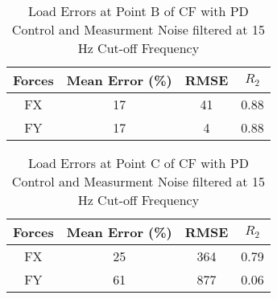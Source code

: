 \begin{table}[h!]
	\centering
	\begin{tabular}{ |c|c|c|c| } 
		\hline
		Forces & Mean Error (\%) & RMSE & $R_2$\\ 
		\hline
		FX & 17&41&0.88\\ 
		FY & 17&4&0.88 \\ 
		\hline
	\end{tabular}
	\caption{Load Errors at Point B of CF with PD Control and Measurment Noise filtered at 15 Hz Cut-off Frequency}
	\label{tab:pureFeedbkPDBFilter}
\end{table}

\begin{table}[h!]
	\centering
	\begin{tabular}{ |c|c|c|c| } 
		\hline
		Forces & Mean Error (\%) & RMSE & $R_2$\\ 
		\hline
		FX & 25&364&0.79\\ 
		FY & 61&877&0.06 \\ 
		\hline
	\end{tabular}
	\caption{Load Errors at Point C of CF with PD Control and Measurment Noise filtered at 15 Hz Cut-off Frequency}
	\label{tab:pureFeedbkPDCFilter}
\end{table}

